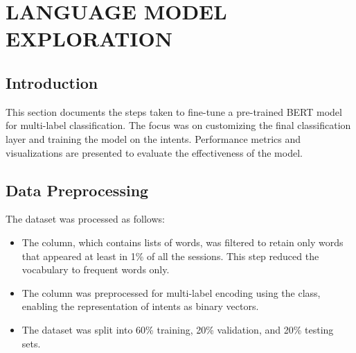 

\section{LANGUAGE MODEL EXPLORATION}


    \subsection{Introduction}
    
        This section documents the steps taken to fine-tune a pre-trained BERT model for multi-label classification.
        The focus was on customizing the final classification layer and training the model on the  intents. Performance metrics and visualizations are presented to evaluate the effectiveness of the model.

    \subsection{Data Preprocessing}

        The dataset was processed as follows:

        \begin{itemize}

            \item The  column, which contains lists of words, was filtered to retain only words that appeared at least in 1\% of all the sessions. This step reduced the vocabulary to frequent words only.

            \item The  column was preprocessed for multi-label encoding using the  class, enabling the representation of intents as binary vectors.

            \item The dataset was split into 60\% training, 20\% validation, and 20\% testing sets.
        \end{itemize}

